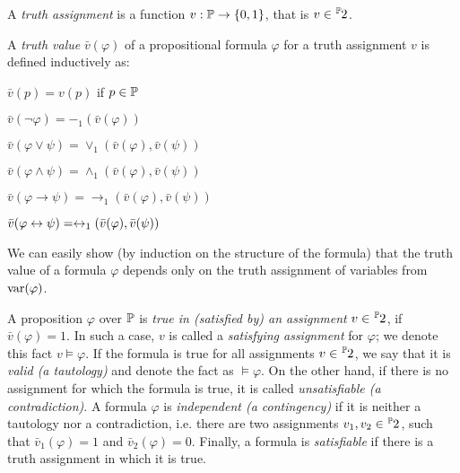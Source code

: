 \begin{definition}
A \emph{truth assignment} is a function $v: \mathbb{P} \to \{0,1\}$, that is $v \in \fset{\Prop}{2}$.

A \emph{truth value} $\bar{v}(\varphi)$ of a propositional formula $\varphi$ for a truth assignment $v$ is defined inductively as:
	\begin{itemize}
		\begin{minipage}{0.5\textwidth}
		\item $\bar{v}(p) = v(p)$ if $p \in \mathbb{P}$
		\item $\bar{v}(\neg \varphi) = -_1(\bar{v}(\varphi))$ 
		\item $\bar{v}(\varphi \lor \psi) = \lor_1(\bar{v}(\varphi),\bar{v}(\psi))$ 
		\end{minipage}
		\begin{minipage}{0.5\textwidth}
		\item $\bar{v}(\varphi \land \psi) = \land_1(\bar{v}(\varphi),\bar{v}(\psi))$ 
		\item $\bar{v}(\varphi \to \psi) = \to_1(\bar{v}(\varphi),\bar{v}(\psi))$ 
		\item $\bar{v}(\varphi \leftrightarrow \psi) = \leftrightarrow_1(\bar{v}(\varphi),\bar{v}(\psi))$ 
		\end{minipage}
	\end{itemize}
\end{definition}

We can easily show (by induction on the structure of the formula) that the truth value of a formula $\varphi$ depends only on the truth assignment of variables from $\operatorname{var}(\varphi)$.

A proposition $\varphi$ over $\mathbb{P}$ is \emph{true in (satisfied by) an assignment} $v\in \fset{\Prop}{2}$, if $\bar{v}(\varphi) = 1$. In such a case, $v$ is called a \emph{satisfying assignment} for $\varphi$; we denote this fact $v \vDash \varphi$. If the formula is true for all assignments $v \in \fset{\Prop}{2}$, we say that it is \emph{valid (a tautology)} and denote the fact as $\vDash \varphi$. On the other hand, if there is no assignment for which the formula is true, it is called \emph{unsatisfiable (a contradiction)}. A formula $\varphi$ is \emph{independent (a contingency)} if it is neither a tautology nor a contradiction, i.e. there are two assignments $v_1, v_2 \in \fset{\Prop}{2}$, such that $\bar{v}_1(\varphi) = 1$ and $\bar{v}_2(\varphi) = 0$. Finally, a formula is \emph{satisfiable} if there is a truth assignment in which it is true.

